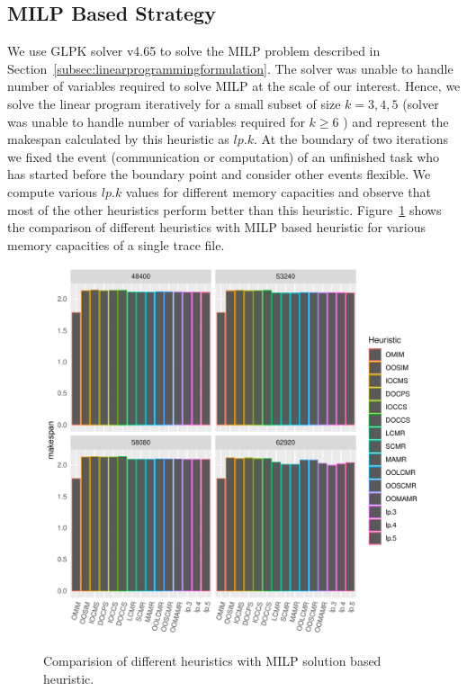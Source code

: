 \documentclass[runningheads]{llncs} %
\begin{document}
\subsection{MILP Based Strategy}
 We use GLPK solver v4.65 to solve the MILP problem described in Section~\ref{subsec:linearprogrammingformulation}. The solver was unable to handle number of variables required to solve MILP at the scale of our interest. Hence, we solve the linear program iteratively for a small subset of size $k=3,4,5$ (solver was unable to handle number of variables required for $k\ge6$ ) and represent the makespan calculated by this heuristic as $lp.k$. At the boundary of two iterations we fixed the event (communication or computation) of an unfinished task who has  started before the boundary point and consider other events flexible. We compute various  $lp.k$ values for different memory capacities and observe that most of the other heuristics perform better than this heuristic. Figure~\ref{fig:iterativeLpSolution} shows the comparison of different heuristics with MILP based heuristic for various memory capacities of a single trace file.

	\begin{figure}[htb]
	\includegraphics[scale=0.5]{./results/makespan_with_lp.pdf}
	\caption{Comparision of different heuristics with MILP solution based heuristic.}
	\label{fig:iterativeLpSolution}
\end{figure}
\end{document}
